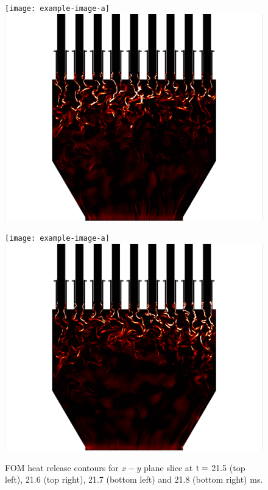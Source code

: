 \begin{figure}
	\begin{minipage}{0.49\linewidth}
		\ifdefined\DRAFT
			\texttt{[image: example-image-a]}
		\else
			\includegraphics[width=0.99\linewidth,trim={0.5em 0em 6cm 0em},clip]{Chapters/HPROMResults/Images/nineElem/example_snaps/example_heat_z_217000.png}
		\fi
	\end{minipage}
	\begin{minipage}{0.49\linewidth}
		\ifdefined\DRAFT
			\texttt{[image: example-image-a]}
		\else
			\includegraphics[width=0.99\linewidth,trim={6cm 0em 0.5em 0em},clip]{Chapters/HPROMResults/Images/nineElem/example_snaps/example_heat_z_218000.png}
		\fi
	\end{minipage}
	\caption{\label{fig:nineElemFOMHeat}FOM heat release contours for $x-y$ plane slice at $\text{t} = $ 21.5 (top left), 21.6 (top right), 21.7 (bottom left) and 21.8 (bottom right) ms.}
\end{figure}

